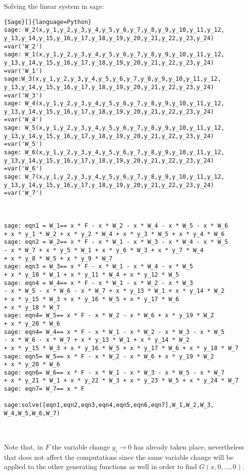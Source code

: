\documentclass[12pt]{report}
\begin{document}
{{\noindent Solving the linear system in sage:
{
\begin{lstlisting}{Sage}[]{language=Python}
sage: W_2(x,y_1,y_2,y_3,y_4,y_5,y_6,y_7,y_8,y_9,y_10,y_11,y_12,
y_13,y_14,y_15,y_16,y_17,y_18,y_19,y_20,y_21,y_22,y_23,y_24)
=var('W_2')
sage: W_1(x,y_1,y_2,y_3,y_4,y_5,y_6,y_7,y_8,y_9,y_10,y_11,y_12,
y_13,y_14,y_15,y_16,y_17,y_18,y_19,y_20,y_21,y_22,y_23,y_24)
=var('W_1')
sage:W_3(x,y_1,y_2,y_3,y_4,y_5,y_6,y_7,y_8,y_9,y_10,y_11,y_12,
y_13,y_14,y_15,y_16,y_17,y_18,y_19,y_20,y_21,y_22,y_23,y_24)
=var('W_3')
sage: W_4(x,y_1,y_2,y_3,y_4,y_5,y_6,y_7,y_8,y_9,y_10,y_11,y_12,
y_13,y_14,y_15,y_16,y_17,y_18,y_19,y_20,y_21,y_22,y_23,y_24)
=var('W_4')
sage: W_5(x,y_1,y_2,y_3,y_4,y_5,y_6,y_7,y_8,y_9,y_10,y_11,y_12,
y_13,y_14,y_15,y_16,y_17,y_18,y_19,y_20,y_21,y_22,y_23,y_24)
=var('W_5')
sage: W_6(x,y_1,y_2,y_3,y_4,y_5,y_6,y_7,y_8,y_9,y_10,y_11,y_12,
y_13,y_14,y_15,y_16,y_17,y_18,y_19,y_20,y_21,y_22,y_23,y_24)
=var('W_6')
sage: W_7(x,y_1,y_2,y_3,y_4,y_5,y_6,y_7,y_8,y_9,y_10,y_11,y_12,
y_13,y_14,y_15,y_16,y_17,y_18,y_19,y_20,y_21,y_22,y_23,y_24)
=var('W_7')



sage: eqn1 = W_1== x * F - x * W_2 - x * W_4 - x * W_5 - x * W_6 
+ x * y_1 * W_2 + x * y_2 * W_4 + x * y_3 * W_5 + x * y_4 * W_6
sage: eqn2 = W_2== x * F - x * W_1 - x * W_3 - x * W_4 - x * W_5 
- x * W_7 + x * y_5 * W_1 + x * y_6 * W_3 + x * y_7 * W_4 
+ x * y_8 * W_5 + x * y_9 * W_7 
sage: eqn3 = W_3== x * F - x * W_1 - x * W_4 - x * W_5 
+ x * y_10 * W_1 + x * y_11 * W_4 + x * y_12 * W_5
sage: eqn4 = W_4== x * F - x * W_1 - x * W_2 - x * W_3 
- x * W_5 - x * W_6 - x * W_7 + x * y_13 * W_1 + x * y_14 * W_2 
+ x * y_15 * W_3 + x * y_16 * W_5 + x * y_17 * W_6 
+ x * y_18 * W_7
sage: eqn4= W_5== x * F - x * W_2 - x * W_6 + x * y_19 * W_2 
+ x * y_20 * W_6
sage: eqn4= W_4== x * F - x * W_1 - x * W_2 - x * W_3 - x * W_5 
- x * W_6 - x * W_7 + x * y_13 * W_1 + x * y_14 * W_2 
+ x * y_15 * W_3 + x * y_16 * W_5 + x * y_17 * W_6 + x * y_18 * W_7
sage: eqn5= W_5== x * F - x * W_2 - x * W_6 + x * y_19 * W_2 
+ x * y_20 * W_6
sage: eqn6= W_6== x * F - x * W_1 - x * W_3 - x * W_5 - x * W_7 
+ x * y_21 * W_1 + x * y_22 * W_3 + x * y_23 * W_5 + x * y_24 * W_7
sage: eqn7= W_7== x * F

sage:solve([eqn1,eqn2,eqn3,eqn4,eqn5,eqn6,eqn7],W_1,W_2,W_3,
W_4,W_5,W_6,W_7)


\end{lstlisting}} \quad \\

\noindent Note that, in $F$ the variable change $y_i \rightarrow 0$ has already taken place, nevertheless that does not affect the computations since the same variable change will be applied to the other generating functions as well in order to find $G(x,0,\ldots,0)$.

}}
\end{document}

